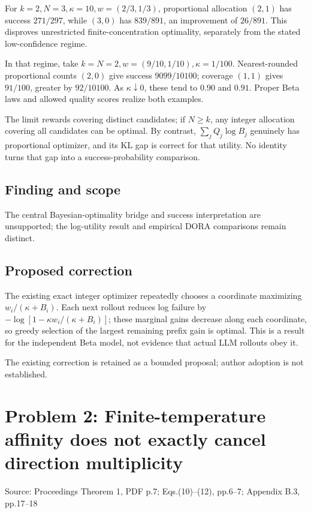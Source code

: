 \documentclass[11pt]{article}
\begin{document}
For \(k=2,N=3,\kappa=10,w=(2/3,1/3)\), proportional allocation \((2,1)\) has success \(271/297\), while \((3,0)\) has \(839/891\), an improvement of \(26/891\). This disproves unrestricted finite-concentration optimality, separately from the stated low-confidence regime.

In that regime, take \(k=N=2,w=(9/10,1/10),\kappa=1/100\). Nearest-rounded proportional counts \((2,0)\) give success \(9099/10100\); coverage \((1,1)\) gives \(91/100\), greater by \(92/10100\). As \(\kappa\downarrow0\), these tend to \(0.90\) and \(0.91\). Proper Beta laws and allowed quality scores realize both examples.

The limit rewards covering distinct candidates; if \(N\geq k\), any integer allocation covering all candidates can be optimal. By contrast, \(\sum_jQ_j\log B_j\) genuinely has proportional optimizer, and its KL gap is correct for that utility. No identity turns that gap into a success-probability comparison.

\subsection*{Finding and scope}

The central Bayesian-optimality bridge and success interpretation are unsupported; the log-utility result and empirical DORA comparisons remain distinct.

\subsection*{Proposed correction}

The existing exact integer optimizer repeatedly chooses a coordinate maximizing \(w_i/(\kappa+B_i)\). Each next rollout reduces log failure by \(-\log[1-\kappa w_i/(\kappa+B_i)]\); these marginal gains decrease along each coordinate, so greedy selection of the largest remaining prefix gain is optimal. This is a result for the independent Beta model, not evidence that actual LLM rollouts obey it.

The existing correction is retained as a bounded proposal; author adoption is not established.

\section*{Problem 2: Finite-temperature affinity does not exactly cancel direction multiplicity}

Source: Proceedings Theorem 1, PDF p.7; Eqs.(10)–(12), pp.6–7; Appendix B.3, pp.17–18
\end{document}
